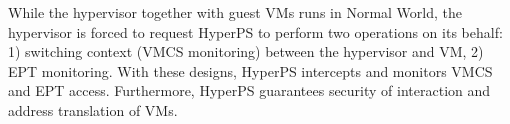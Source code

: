\documentclass[conference]{IEEEtran}
\begin{document}
While the hypervisor together with guest VMs runs in Normal World, the hypervisor is forced to request HyperPS to perform two operations on its behalf: 1) switching context (VMCS monitoring) between the hypervisor and VM, 2) EPT monitoring. 
 With these designs, HyperPS intercepts and monitors VMCS and EPT access. Furthermore, HyperPS guarantees security of interaction and address translation of VMs.



%
%
%
%
\end{document}
